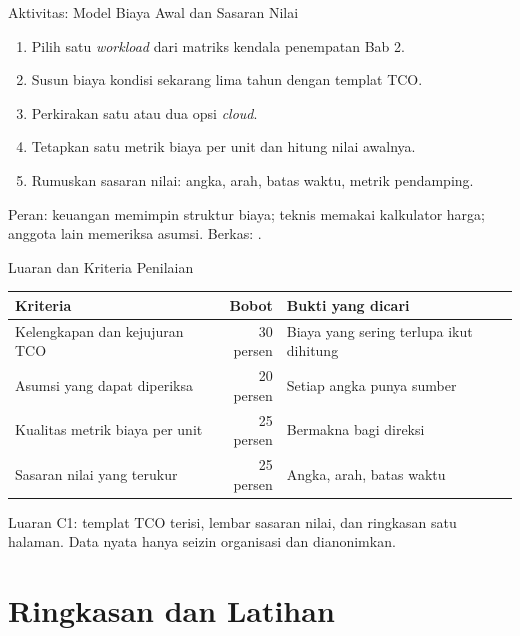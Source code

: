 \documentclass[aspectratio=169, table, 12pt]{beamer}
\begin{document}
\begin{frame}{{\Large Aktivitas: Model Biaya Awal dan Sasaran Nilai}}
  \small
  \begin{enumerate}
    \item Pilih satu \textit{workload} dari matriks kendala penempatan Bab 2.
    \item Susun biaya kondisi sekarang lima tahun dengan templat TCO.
    \item Perkirakan satu atau dua opsi \textit{cloud}.
    \item Tetapkan satu metrik biaya per unit dan hitung nilai awalnya.
    \item Rumuskan sasaran nilai: angka, arah, batas waktu, metrik pendamping.
  \end{enumerate}
  \vspace{4pt}
  \footnotesize
  Peran: keuangan memimpin struktur biaya; teknis memakai kalkulator harga;
  anggota lain memeriksa asumsi. Berkas: .
\end{frame}

\begin{frame}{{\Large Luaran dan Kriteria Penilaian}}
  \footnotesize
  \begin{tabularx}{\textwidth}{>{\raggedright\arraybackslash}X r
      >{\raggedright\arraybackslash}X}
    \hline
    \textbf{Kriteria} & \textbf{Bobot} & \textbf{Bukti yang dicari} \\
    \hline
    Kelengkapan dan kejujuran TCO & 30 persen & Biaya yang sering terlupa ikut
      dihitung \\
    \hline
    Asumsi yang dapat diperiksa & 20 persen & Setiap angka punya sumber \\
    \hline
    Kualitas metrik biaya per unit & 25 persen & Bermakna bagi direksi \\
    \hline
    Sasaran nilai yang terukur & 25 persen & Angka, arah, batas waktu \\
    \hline
  \end{tabularx}

  \vspace{10pt}
  \small
  Luaran C1: templat TCO terisi, lembar sasaran nilai, dan ringkasan satu
  halaman. Data nyata hanya seizin organisasi dan dianonimkan.
\end{frame}

\section{Ringkasan dan Latihan}
\end{document}
